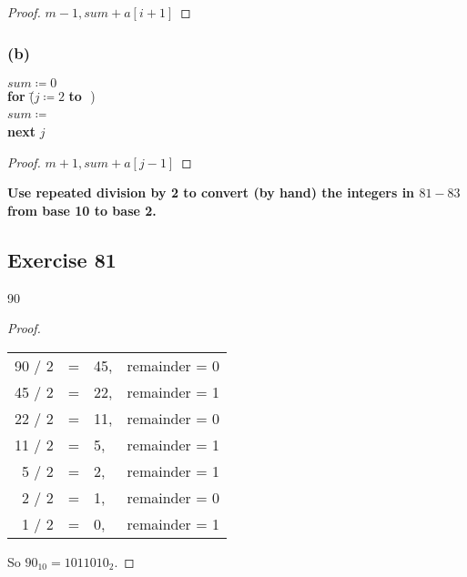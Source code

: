 \documentclass[14pt]{extarticle}
\newcommand{\fbl}{\underline{\hspace{1cm}}\,\,}
\newcommand{\cy}{\color{cyan}}
\begin{document}
\begin{proof}
    $m - 1, sum + a[i + 1]$
\end{proof}

\subsubsection{(b)}
\begin{tabbing}
    $sum \coloneqq 0$ \\
    {\bf for} \= ($j \coloneqq 2$ {\bf to} \fbl) \\
    \> $sum \coloneqq$ \fbl \\
    {\bf next} $j$
\end{tabbing}

\begin{proof}
    $m + 1, sum + a[j - 1]$
\end{proof}

{\bf\cy Use repeated division by 2 to convert (by hand) the integers in $81-83$ from base 10 to base 2.}

\subsection{Exercise 81}
90
\begin{proof}
    \begin{center}
        \begin{tabular}{rcll}
            90 / 2 & = & 45, & remainder = 0 \\
            45 / 2 & = & 22, & remainder = 1 \\
            22 / 2 & = & 11, & remainder = 0 \\
            11 / 2 & = & 5,  & remainder = 1 \\
            5 / 2  & = & 2,  & remainder = 1 \\
            2 / 2  & = & 1,  & remainder = 0 \\
            1 / 2  & = & 0,  & remainder = 1
        \end{tabular}
    \end{center}
    So $90_{10} = 1011010_2$.
\end{proof}
\end{document}
